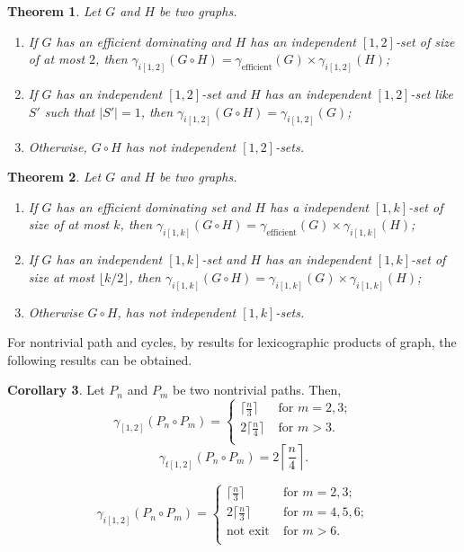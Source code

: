 \documentclass[A4,12pt]{article}
\newtheorem{theorem}{Theorem}[section]
\theoremstyle{definition}
\newtheorem{corollary}[theorem]{Corollary}
\theoremstyle{remark}
\begin{document}
\begin{theorem} \label{lexthemind}
	Let $G$ and $H$ be two graphs.
 \begin{enumerate}
  \item [a)]
   If $G$  has  an efficient dominating and $H$  has an independent $[1,2]$-set of size of at most $2$, then $\gamma_{i[1,2]}(G \circ H)= \gamma_{\text{efficient}}(G) \times \gamma_{i[1,2]}(H) $;
  \item [b)]
  If $G$  has an independent $[1,2]$-set  and $H$  has an independent $[1,2]$-set  like $S'$ such that $\vert S' \vert=1$, then $\gamma_{i[1,2]}(G \circ H)=\gamma_{i[1,2]}(G)$;
  \item [c)]
  Otherwise, $G \circ H$ has not independent $[1,2]$-sets.
\end{enumerate}
\end{theorem}

\begin{theorem} \label{lexthemindk}
	Let $G$ and $H$ be two graphs.
 \begin{enumerate}
  \item [a)]
   If $G$  has  an efficient dominating set and $H$  has a independent $[1,k]$-set of size of at most $k$, then $\gamma_{i[1,k]}(G \circ H)= \gamma_{\text{efficient}}(G) \times\gamma_{i[1,k]}(H) $;
  \item [b)]
  If $G$  has an independent $[1,k]$-set and $H$  has an independent $[1,k]$-set of size at most $\lfloor k/2 \rfloor$, then $\gamma_{i[1,k]}(G \circ H)= \gamma_{i[1,k]}(G) \times \gamma_{i[1,k]}(H) $;
  \item [c)]
  Otherwise $G \circ H$, has not independent $[1,k]$-sets.
\end{enumerate}
\end{theorem}

For nontrivial path and cycles, by results for lexicographic products of graph, the following results can be obtained.
 \begin{corollary}\label{a}
 Let $P_n$ and $P_m$ be two  nontrivial paths. Then,
\begin{equation*}
\gamma_{[1, 2]}(P_n \circ P_m)  =\left\{
\begin{array}{ll}
\lceil \frac{n}{3}\rceil\; & \text{for } m=2,3;\\
2\lceil \frac{n}{4}\rceil\; & \text{for } m>3.\\
\end{array} \right.
\end{equation*}
$$\gamma_{t[1, 2]}(P_n \circ P_m)  =2\left\lceil \frac{n}{4}\right\rceil.$$

\begin{equation*}
\gamma_{i[1, 2]}(P_n \circ P_m)  =\left\{
\begin{array}{ll}
\lceil \frac{n}{3}\rceil\; & \text{for } m=2,3;\\
2\lceil \frac{n}{3}\rceil\; & \text{for } m=4,5,6;\\
\text{not exit} \; & \text{for } m>6.\\
\end{array} \right.
\end{equation*}
\end{corollary}
\end{document}

